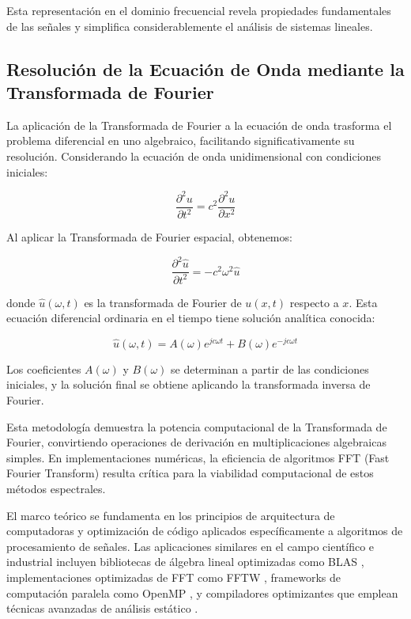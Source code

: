 \documentclass[a4paper]{article}
\begin{document}
Esta representación en el dominio frecuencial revela propiedades fundamentales de las señales y simplifica considerablemente el
análisis de sistemas lineales.

\subsection{Resolución de la Ecuación de Onda mediante la Transformada de Fourier}

La aplicación de la Transformada de Fourier a la ecuación de onda trasforma el problema diferencial en uno algebraico, facilitando
significativamente su resolución. Considerando la ecuación de onda unidimensional con condiciones iniciales:

\begin{equation}
    \frac{\partial^2 u}{\partial t^2} = c^2 \frac{\partial^2 u}{\partial x^2}
\end{equation}

Al aplicar la Transformada de Fourier espacial, obtenemos:

\begin{equation}
    \frac{\partial^2 \hat{u}}{\partial t^2} = -c^2 \omega^2 \hat{u}
\end{equation}

donde $\hat{u}(\omega, t)$ es la transformada de Fourier de $u(x,t)$ respecto a $x$. Esta ecuación diferencial ordinaria en el
tiempo tiene solución analítica conocida:

\begin{equation}
    \hat{u}(\omega, t) = A(\omega) e^{jc\omega t} + B(\omega) e^{-jc\omega t}
\end{equation}

Los coeficientes $A(\omega)$ y $B(\omega)$ se determinan a partir de las condiciones iniciales, y la solución final se obtiene
aplicando la transformada inversa de Fourier.

Esta metodología demuestra la potencia computacional de la Transformada de Fourier, convirtiendo operaciones de derivación en
multiplicaciones algebraicas simples. En implementaciones numéricas, la eficiencia de algoritmos FFT (Fast Fourier Transform)
resulta crítica para la viabilidad computacional de estos métodos espectrales.

El marco teórico se fundamenta en los principios de arquitectura de computadoras y optimización de código aplicados específicamente
a algoritmos de procesamiento de señales. Las aplicaciones similares en el campo científico e industrial incluyen bibliotecas de
álgebra lineal optimizadas como BLAS \cite{lawson1979basic}, implementaciones optimizadas de FFT como FFTW \cite{frigo2005design},
frameworks de computación paralela como OpenMP \cite{dagum1998openmp}, y compiladores optimizantes que emplean técnicas avanzadas de
análisis estático \cite{muchnick1997advanced}.
\end{document}
